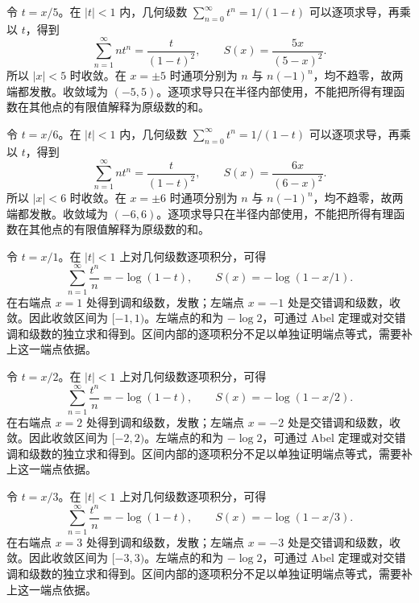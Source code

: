 \documentclass[12pt,fontset=fandol]{ctexart}
\begin{document}
\begin{solve}\label{ans:c26q12}
令 $t=x/5$。在 $|t|<1$ 内，几何级数 $\sum_{n=0}^\infty t^n=1/(1-t)$ 可以逐项求导，再乘以 $t$，得到
\[
\sum_{n=1}^\infty nt^n=\frac{t}{(1-t)^2},\qquad S(x)=\frac{5x}{(5-x)^2}.
\]
所以 $|x|<5$ 时收敛。在 $x=\pm 5$ 时通项分别为 $n$ 与 $n(-1)^n$，均不趋零，故两端都发散。收敛域为 $(-5,5)$。逐项求导只在半径内部使用，不能把所得有理函数在其他点的有限值解释为原级数的和。
\end{solve}

\begin{solve}\label{ans:c26q13}
令 $t=x/6$。在 $|t|<1$ 内，几何级数 $\sum_{n=0}^\infty t^n=1/(1-t)$ 可以逐项求导，再乘以 $t$，得到
\[
\sum_{n=1}^\infty nt^n=\frac{t}{(1-t)^2},\qquad S(x)=\frac{6x}{(6-x)^2}.
\]
所以 $|x|<6$ 时收敛。在 $x=\pm 6$ 时通项分别为 $n$ 与 $n(-1)^n$，均不趋零，故两端都发散。收敛域为 $(-6,6)$。逐项求导只在半径内部使用，不能把所得有理函数在其他点的有限值解释为原级数的和。
\end{solve}

\begin{solve}\label{ans:c26q14}
令 $t=x/1$。在 $|t|<1$ 上对几何级数逐项积分，可得
\[
\sum_{n=1}^\infty\frac{t^n}n=-\log(1-t),\qquad S(x)=-\log(1-x/1).
\]
在右端点 $x=1$ 处得到调和级数，发散；左端点 $x=-1$ 处是交错调和级数，收敛。因此收敛区间为 $[-1,1)$。左端点的和为 $-\log2$，可通过 Abel 定理或对交错调和级数的独立求和得到。区间内部的逐项积分不足以单独证明端点等式，需要补上这一端点依据。
\end{solve}

\begin{solve}\label{ans:c26q15}
令 $t=x/2$。在 $|t|<1$ 上对几何级数逐项积分，可得
\[
\sum_{n=1}^\infty\frac{t^n}n=-\log(1-t),\qquad S(x)=-\log(1-x/2).
\]
在右端点 $x=2$ 处得到调和级数，发散；左端点 $x=-2$ 处是交错调和级数，收敛。因此收敛区间为 $[-2,2)$。左端点的和为 $-\log2$，可通过 Abel 定理或对交错调和级数的独立求和得到。区间内部的逐项积分不足以单独证明端点等式，需要补上这一端点依据。
\end{solve}

\begin{solve}\label{ans:c26q16}
令 $t=x/3$。在 $|t|<1$ 上对几何级数逐项积分，可得
\[
\sum_{n=1}^\infty\frac{t^n}n=-\log(1-t),\qquad S(x)=-\log(1-x/3).
\]
在右端点 $x=3$ 处得到调和级数，发散；左端点 $x=-3$ 处是交错调和级数，收敛。因此收敛区间为 $[-3,3)$。左端点的和为 $-\log2$，可通过 Abel 定理或对交错调和级数的独立求和得到。区间内部的逐项积分不足以单独证明端点等式，需要补上这一端点依据。
\end{solve}
\end{document}
